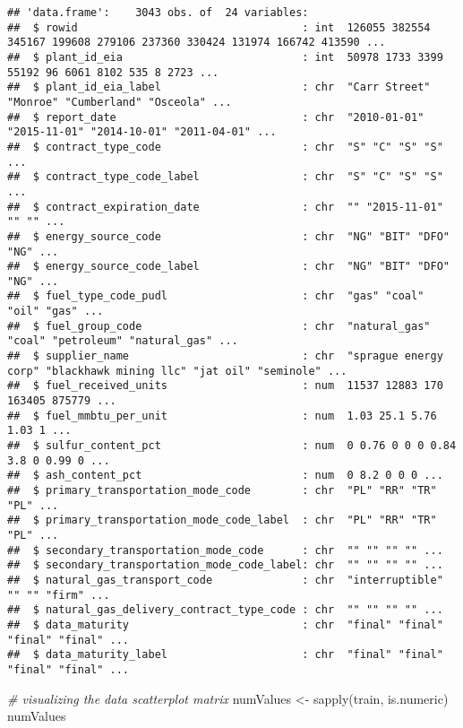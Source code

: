 \documentclass[
]{article}
\newenvironment{Shaded}{\begin{snugshade}}{\end{snugshade}}
\newcommand{\CommentTok}[1]{\textcolor[rgb]{0.56,0.35,0.01}{\textit{#1}}}
\newcommand{\FunctionTok}[1]{\textcolor[rgb]{0.00,0.00,0.00}{#1}}
\newcommand{\NormalTok}[1]{#1}
\newcommand{\OtherTok}[1]{\textcolor[rgb]{0.56,0.35,0.01}{#1}}
\begin{document}
\begin{verbatim}
## 'data.frame':    3043 obs. of  24 variables:
##  $ rowid                                   : int  126055 382554 345167 199608 279106 237360 330424 131974 166742 413590 ...
##  $ plant_id_eia                            : int  50978 1733 3399 55192 96 6061 8102 535 8 2723 ...
##  $ plant_id_eia_label                      : chr  "Carr Street" "Monroe" "Cumberland" "Osceola" ...
##  $ report_date                             : chr  "2010-01-01" "2015-11-01" "2014-10-01" "2011-04-01" ...
##  $ contract_type_code                      : chr  "S" "C" "S" "S" ...
##  $ contract_type_code_label                : chr  "S" "C" "S" "S" ...
##  $ contract_expiration_date                : chr  "" "2015-11-01" "" "" ...
##  $ energy_source_code                      : chr  "NG" "BIT" "DFO" "NG" ...
##  $ energy_source_code_label                : chr  "NG" "BIT" "DFO" "NG" ...
##  $ fuel_type_code_pudl                     : chr  "gas" "coal" "oil" "gas" ...
##  $ fuel_group_code                         : chr  "natural_gas" "coal" "petroleum" "natural_gas" ...
##  $ supplier_name                           : chr  "sprague energy corp" "blackhawk mining llc" "jat oil" "seminole" ...
##  $ fuel_received_units                     : num  11537 12883 170 163405 875779 ...
##  $ fuel_mmbtu_per_unit                     : num  1.03 25.1 5.76 1.03 1 ...
##  $ sulfur_content_pct                      : num  0 0.76 0 0 0 0.84 3.8 0 0.99 0 ...
##  $ ash_content_pct                         : num  0 8.2 0 0 0 ...
##  $ primary_transportation_mode_code        : chr  "PL" "RR" "TR" "PL" ...
##  $ primary_transportation_mode_code_label  : chr  "PL" "RR" "TR" "PL" ...
##  $ secondary_transportation_mode_code      : chr  "" "" "" "" ...
##  $ secondary_transportation_mode_code_label: chr  "" "" "" "" ...
##  $ natural_gas_transport_code              : chr  "interruptible" "" "" "firm" ...
##  $ natural_gas_delivery_contract_type_code : chr  "" "" "" "" ...
##  $ data_maturity                           : chr  "final" "final" "final" "final" ...
##  $ data_maturity_label                     : chr  "final" "final" "final" "final" ...
\end{verbatim}

\begin{Shaded}
\begin{Highlighting}[]
\CommentTok{\# visualizing the data scatterplot matrix}
\NormalTok{numValues }\OtherTok{\textless{}{-}} \FunctionTok{sapply}\NormalTok{(train, is.numeric)}
\NormalTok{numValues}
\end{Highlighting}
\end{Shaded}
\end{document}
